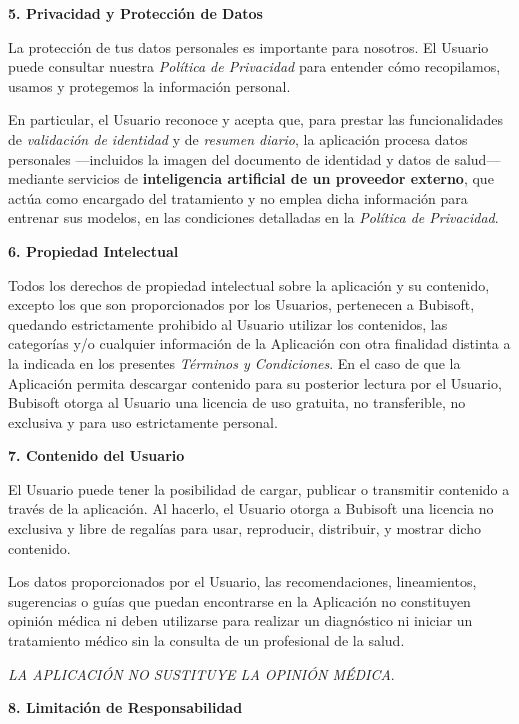 \documentclass[a4paper,12pt]{article}
\newcommand{\saltolinea}{\par\vspace{\baselineskip}}
\begin{document}
    \par \textbf{5. Privacidad y Protección de Datos} 
    \saltolinea
    \par La protección de tus datos personales es importante para nosotros. El Usuario puede consultar nuestra \textit{Política de Privacidad} para entender cómo recopilamos, usamos y protegemos la información personal.
    \par En particular, el Usuario reconoce y acepta que, para prestar las funcionalidades de \textit{validación de identidad} y de \textit{resumen diario}, la aplicación procesa datos personales —incluidos la imagen del documento de identidad y datos de salud— mediante servicios de \textbf{inteligencia artificial de un proveedor externo}, que actúa como encargado del tratamiento y no emplea dicha información para entrenar sus modelos, en las condiciones detalladas en la \textit{Política de Privacidad}.
    \saltolinea
    \par \textbf{6. Propiedad Intelectual} 
    \saltolinea
    \par Todos los derechos de propiedad intelectual sobre la aplicación y su contenido, excepto los que son proporcionados por los Usuarios, pertenecen a Bubisoft, quedando estrictamente prohibido al Usuario utilizar los contenidos, las categorías y/o cualquier información de la Aplicación con otra finalidad distinta a la indicada en los presentes \textit{Términos y Condiciones}. En el caso de que la Aplicación permita descargar contenido para su posterior lectura por el Usuario, Bubisoft otorga al Usuario una licencia de uso gratuita, no transferible, no exclusiva y para uso estrictamente personal. 
    \saltolinea
    \par \textbf{7. Contenido del Usuario} 
    \saltolinea
    \par El Usuario puede tener la posibilidad de cargar, publicar o transmitir contenido a través de la aplicación. Al hacerlo, el Usuario otorga a Bubisoft una licencia no exclusiva y libre de regalías para usar, reproducir, distribuir, y mostrar dicho contenido.
    \par Los datos proporcionados por el Usuario, las recomendaciones, lineamientos, sugerencias o guías que puedan encontrarse en la Aplicación no constituyen opinión médica ni deben utilizarse para realizar un diagnóstico ni iniciar un tratamiento médico sin la consulta de un profesional de la salud.
    \par \textit{LA APLICACIÓN NO SUSTITUYE LA OPINIÓN MÉDICA}. 
    \saltolinea
    \par \textbf{8. Limitación de Responsabilidad} 
\end{document}
